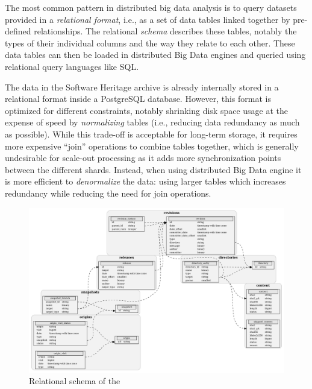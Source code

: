 The most common pattern in distributed big data analysis is to query datasets
provided in a \emph{relational format}, i.e., as a set of data tables linked
together by pre-defined relationships. The relational \emph{schema} describes
these tables, notably the types of their individual columns and the way they
relate to each other. These data tables can then be loaded in distributed Big
Data engines and queried using relational query languages like SQL.

The data in the Software Heritage archive is already internally stored in a
relational format inside a PostgreSQL database. However, this format is
optimized for different constraints, notably shrinking disk space usage at the
expense of speed by \emph{normalizing} tables (i.e., reducing data redundancy
as much as possible). While this trade-off is acceptable for long-term storage,
it requires more expensive ``join'' operations to combine tables together,
which is generally undesirable for scale-out processing as it adds more
synchronization points between the different shards. Instead, when using
distributed Big Data engine it is more efficient to \emph{denormalize} the
data: using larger tables which increases redundancy while reducing the need
for join operations.

\begin{figure}
    \includegraphics[width=\linewidth]{../img/graph-dataset/db-schema}
    \caption{Relational schema of the \SWHGD{}}%
    \label{fig:swh-dataset-schema}
\end{figure}

